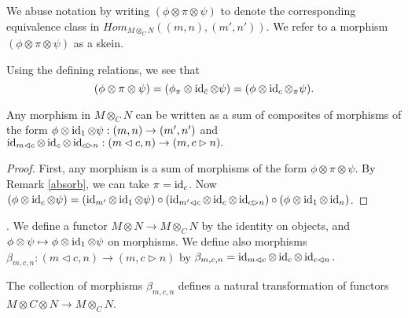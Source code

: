 \begin{remark}
 
We abuse notation by writing $(\phi\otimes\pi\otimes\psi)$ to denote the
corresponding equivalence class in $Hom_{M\otimes_C N}((m,n),(m',n'))$. We
refer to a morphism $(\phi\otimes\pi\otimes\psi)$ as a skein.\end{remark}


\begin{remark}\label{absorb}
  
  Using the defining relations, we see
  that
  \[
    (\phi\otimes\pi\otimes\psi) =
    (\phi_{\pi}\otimes\operatorname{id}_{\bar{c}}\otimes\psi) =
    (\phi\otimes\operatorname{id}_c\otimes{_{\pi}\psi}).
  \]
\end{remark}

\begin{lemma}\label{decompose}
  Any morphism in $M\otimes_C N$ can be written as a sum of composites of
  morphisms of the form $\phi\otimes\operatorname{id}_{1}\otimes\psi:(m,n)\to(m',n')$ and
  $\operatorname{id}_{m\lhd c}\otimes\operatorname{id}_c\otimes\operatorname{id}_{c\rhd n}:(m\lhd c,n)\to(m,c\rhd n).$
\end{lemma}

\begin{proof}
  First, any morphism is a sum of morphisms of the form
  $\phi\otimes\pi\otimes\psi$. By Remark \ref{absorb}, we can take
  $\pi=\operatorname{id}_c$. Now
  $(\phi\otimes\operatorname{id}_c\otimes\psi)
  =
  (\operatorname{id}_{m'}\otimes\operatorname{id}_1\otimes\psi)
  \circ
  (\operatorname{id}_{m'\lhd c}\otimes\operatorname{id}_c\otimes\operatorname{id}_{c\rhd n})
  \circ
  (\phi\otimes\operatorname{id}_1\otimes\operatorname{id}_n)$.
\end{proof}


\begin{definition}\label{definition/preskeinification}.
  We define a functor $M\otimes N\to M\otimes_C N$ by the identity on objects,
  and $\phi\otimes\psi\mapsto\phi\otimes\operatorname{id}_1\otimes\psi$ on morphisms. We
  define also morphisms $\beta_{m,c,n}:(m\lhd c,n)\to (m, c \rhd n)$ by
  $\beta_{m,c,n}=\operatorname{id}_{m\lhd c}\otimes\operatorname{id}_c\otimes\operatorname{id}_{c\lhd n}.$

  \begin{center}\end{center}

\end{definition}

\begin{lemma}\label{beta_natural}
  The collection of morphisms $\beta_{m,c,n}$ defines a natural transformation
  of functors $M\otimes C \otimes N\to M\otimes_C N$.
\end{lemma}

